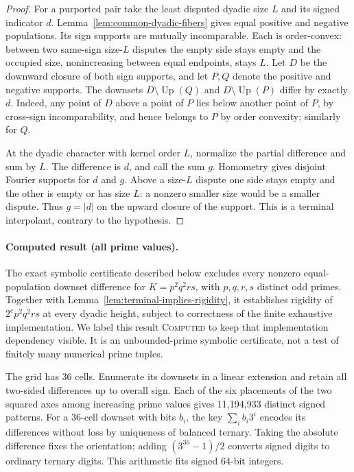 \documentclass[11pt]{article}
\numberwithin{equation}{section}
\theoremstyle{definition}
\theoremstyle{remark}
\begin{document}
\begin{proof}
For a purported pair take the least disputed dyadic size \(L\) and
its signed indicator \(d\). Lemma~\ref{lem:common-dyadic-fibers}
gives equal positive and negative populations. Its sign supports are
mutually incomparable. Each is order-convex: between two same-sign
size-\(L\) disputes the empty side stays empty and the occupied
size, nonincreasing between equal endpoints, stays \(L\).
Let \(D\) be the downward closure of both sign supports, and let
\(P,Q\) denote the positive and negative supports. The downsets
\(D\setminus\operatorname{Up}(Q)\) and
\(D\setminus\operatorname{Up}(P)\) differ by exactly \(d\).
Indeed, any point of \(D\) above a point of \(P\) lies below
another point of \(P\), by cross-sign incomparability, and hence
belongs to \(P\) by order convexity; similarly for \(Q\).

At the dyadic character with kernel order \(L\), normalize the
partial difference and sum by \(L\). The difference is \(d\),
and call the sum \(g\). Homometry gives disjoint Fourier supports
for \(d\) and \(g\). Above a size-\(L\) dispute one side stays
empty and the other is empty or has size \(L\): a nonzero smaller
size would be a smaller dispute. Thus \(g=|d|\) on the upward
closure of the support. This is a terminal interpolant, contrary to
the hypothesis.
\end{proof}

\paragraph{Computed result (all prime values).}
The exact symbolic certificate described below excludes every nonzero
equal-population downset difference for \(K=p^2q^2rs\), with
\(p,q,r,s\) distinct odd primes. Together with
Lemma~\ref{lem:terminal-implies-rigidity}, it establishes rigidity of
\(2^ep^2q^2rs\) at every dyadic height, subject to correctness of the
finite exhaustive implementation. We label this result \textsc{Computed}
to keep that implementation dependency visible. It is an unbounded-prime
symbolic certificate, not a test of finitely many numerical prime tuples.

The grid has 36 cells. Enumerate its downsets in a linear extension and
retain all two-sided differences up to overall sign. Each of the six
placements of the two squared axes among increasing prime values gives
11,194,933 distinct signed patterns. For a 36-cell downset with bits
\(b_i\), the key \(\sum_i b_i3^i\) encodes its differences without
loss by uniqueness of balanced ternary. Taking the absolute difference
fixes the orientation; adding \((3^{36}-1)/2\) converts signed digits
to ordinary ternary digits. This arithmetic fits signed 64-bit integers.
\end{document}
